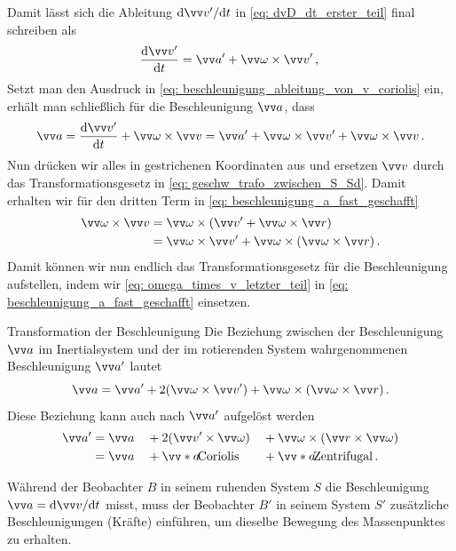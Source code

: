 Damit lässt sich die Ableitung $\dd \ivec{v}'/\dd t$ in \cref{eq: dvD_dt_erster_teil} final schreiben als 
\begin{equation}
    \frac{\dd \ivec{v}'}{\dd t} = \ivec{a}' + \ivec{\omega} \times \ivec{v}' \mComma
\end{equation}
Setzt man den Ausdruck in \cref{eq: beschleunigung_ableitung_von_v_coriolis} ein, erhält man schließlich für die Beschleunigung $\ivec{a}$, dass 
\begin{equation}\label{eq: beschleunigung_a_fast_geschafft}
    \ivec{a} =  \frac{\dd\ivec{v}'}{\dd t} + \ivec{\omega} \times \ivec{v} = \ivec{a}' + \ivec{\omega} \times \ivec{v}' + \ivec{\omega} \times \ivec{v}\mDot
\end{equation}
Nun drücken wir alles in gestrichenen Koordinaten aus und ersetzen $\ivec{v}$ durch das Transformationsgesetz in \cref{eq: geschw_trafo_zwischen_S_Sd}. Damit erhalten wir für den dritten Term in \cref{eq: beschleunigung_a_fast_geschafft} 
\begin{equation}\label{eq: omega_times_v_letzter_teil}\begin{aligned}
    \ivec{\omega} \times \ivec{v} &= \ivec{\omega} \times \left( \ivec{v'} + \ivec{\omega} \times \ivec{r} \right) \\
    &= \ivec{\omega} \times \ivec{v'} + \ivec{\omega} \times (\ivec{\omega} \times \ivec{r} ) \mDot 
\end{aligned}\end{equation}
Damit können wir nun endlich das Transformationsgesetz für die Beschleunigung aufstellen, indem wir \cref{eq: omega_times_v_letzter_teil} in \cref{eq: beschleunigung_a_fast_geschafft} einsetzen.
\begin{rememberbox}[]{Transformation der Beschleunigung}
    Die Beziehung zwischen der Beschleunigung $\ivec{a}$ im Inertialsystem und der im rotierenden System wahrgenommenen Beschleunigung $\ivec{a}'$ lautet
    \begin{equation}\label{eq: a_transformationsgesetz_beschleunigung_coriolis_zentrifugal}
        \ivec{a} = \ivec{a}' + 2(\ivec{\omega} \times \ivec{v}') + \ivec{\omega} \times (\ivec{\omega} \times \ivec{r}) \mDot
    \end{equation}\label{eq: aD_transformationsgesetz_beschleunigung_coriolis_zentrifugal}
    Diese Beziehung kann auch nach $\ivec{a}'$ aufgelöst werden 
    \begin{equation}\begin{aligned}
        \ivec{a}' &= \ivec{a} &&+ 2(\ivec{v}' \times \ivec{\omega}) &&+ \ivec{\omega} \times (\ivec{r} \times \ivec{\omega}) \\
        &= \ivec{a} &&+ \ivecS{a}{\text{Coriolis}} &&+ \ivecS{a}{\text{Zentrifugal}} \mDot 
    \end{aligned}\end{equation}
\end{rememberbox}
Während der Beobachter $B$ in seinem ruhenden System $S$ die Beschleunigung $\ivec{a} = \dd \ivec{v}/\dd t$ misst, muss der Beobachter $B'$ in seinem System $S'$ zusätzliche Beschleunigungen (Kräfte) einführen, um dieselbe Bewegung des Massenpunktes zu erhalten. \\

